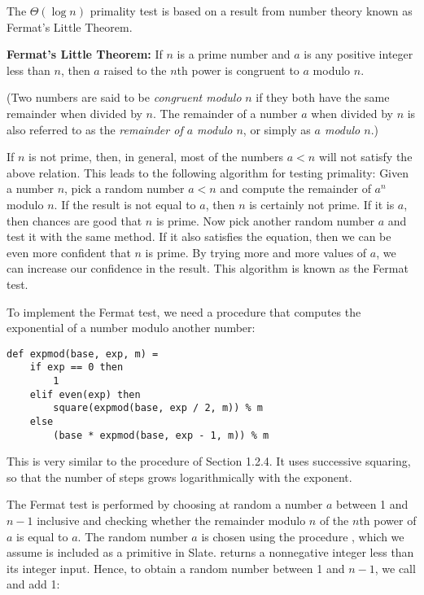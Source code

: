 The $\Theta(\log n)$ primality test is based on a result from number theory known as Fermat's Little Theorem.

\textbf{Fermat's Little Theorem:} If $n$ is a prime number and $a$ is any positive integer less than $n$, then $a$ raised to the $n$th power is congruent to $a$ modulo $n$.

(Two numbers are said to be \emph{congruent modulo} $n$ if they both have the same remainder when divided by $n$. The remainder of a number $a$ when divided by $n$ is also referred to as the \emph{remainder of $a$ modulo $n$}, or simply as \emph{$a$ modulo $n$}.)

If $n$ is not prime, then, in general, most of the numbers $a < n$ will not satisfy the above relation. This leads to the following algorithm for testing primality: Given a number $n$, pick a random number $a < n$ and compute the remainder of $a^n$ modulo $n$. If the result is not equal to $a$, then $n$ is certainly not prime. If it is $a$, then chances are good that $n$ is prime. Now pick another random number $a$ and test it with the same method. If it also satisfies the equation, then we can be even more confident that $n$ is prime. By trying more and more values of $a$, we can increase our confidence in the result. This algorithm is known as the Fermat test.

To implement the Fermat test, we need a procedure that computes the exponential of a number modulo another number:

\begin{lstlisting}
def expmod(base, exp, m) =
    if exp == 0 then
        1
    elif even(exp) then
        square(expmod(base, exp / 2, m)) % m
    else
        (base * expmod(base, exp - 1, m)) % m
\end{lstlisting}

This is very similar to the  procedure of Section 1.2.4. It uses successive squaring, so that the number of steps grows logarithmically with the exponent.

The Fermat test is performed by choosing at random a number $a$ between 1 and $n - 1$ inclusive and checking whether the remainder modulo $n$ of the $n$th power of $a$ is equal to $a$. The random number $a$ is chosen using the procedure , which we assume is included as a primitive in Slate.  returns a nonnegative integer less than its integer input. Hence, to obtain a random number between 1 and $n - 1$, we call  and add 1:

